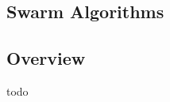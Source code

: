 

\renewcommand{\bibsection}{\subsection{\bibname}}
\begin{bibunit}

\chapter{Swarm Algorithms}
\label{ch:swarm}

\section{Overview}
todo


\putbib
\end{bibunit}


\newpage\begin{bibunit}\putbib\end{bibunit}
\newpage\begin{bibunit}\putbib\end{bibunit}
\newpage\begin{bibunit}\putbib\end{bibunit}
\newpage\begin{bibunit}\putbib\end{bibunit}
\newpage\begin{bibunit}\putbib\end{bibunit}

